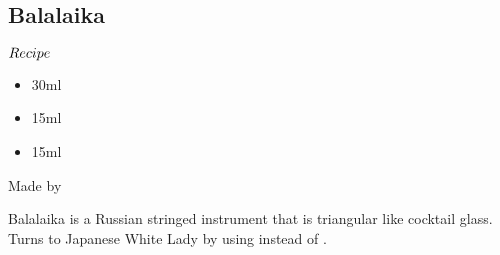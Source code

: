 \subsection{Balalaika}
\begin{itembox}[l]{\boldmath $Recipe$}
\begin{itemize}
\setlength{\parskip}{0cm}
\setlength{\itemsep}{0cm}
\item \vodka 30ml
\item \wc 15ml
\item \lj 15ml
\end{itemize}
\vspace{-4mm}
Made by \shake
\end{itembox}
Balalaika is a Russian stringed instrument that is triangular like cocktail glass.
Turns to Japanese White Lady by using \gin instead of \vodka
\hspace{-1mm}.
